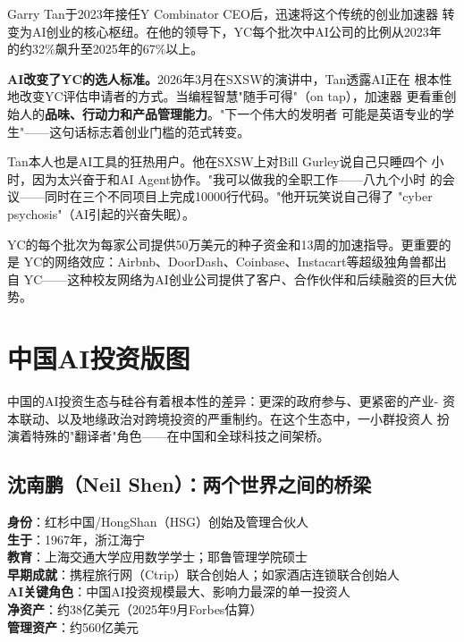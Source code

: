 Garry Tan于2023年接任Y Combinator CEO后，迅速将这个传统的创业加速器
转变为AI创业的核心枢纽。在他的领导下，YC每个批次中AI公司的比例从2023年
的约32\%飙升至2025年的67\%以上。

\textbf{AI改变了YC的选人标准。}2026年3月在SXSW的演讲中，Tan透露AI正在
根本性地改变YC评估申请者的方式。当编程智慧"随手可得"（on tap），加速器
更看重创始人的\textbf{品味、行动力和产品管理能力}。"下一个伟大的发明者
可能是英语专业的学生"——这句话标志着创业门槛的范式转变。

Tan本人也是AI工具的狂热用户。他在SXSW上对Bill Gurley说自己只睡四个
小时，因为太兴奋于和AI Agent协作。"我可以做我的全职工作——八九个小时
的会议——同时在三个不同项目上完成10000行代码。"他开玩笑说自己得了
"cyber psychosis"（AI引起的兴奋失眠）。

YC的每个批次为每家公司提供50万美元的种子资金和13周的加速指导。更重要的是
YC的网络效应：Airbnb、DoorDash、Coinbase、Instacart等超级独角兽都出自
YC——这种校友网络为AI创业公司提供了客户、合作伙伴和后续融资的巨大优势。


\section{中国AI投资版图}
\label{sec:inv-china}

中国的AI投资生态与硅谷有着根本性的差异：更深的政府参与、更紧密的产业-
资本联动、以及地缘政治对跨境投资的严重制约。在这个生态中，一小群投资人
扮演着特殊的"翻译者"角色——在中国和全球科技之间架桥。

\subsection{沈南鹏（Neil Shen）：两个世界之间的桥梁}
\label{subsec:inv-shen}

\begin{corebox}
\textbf{身份}：红杉中国/HongShan（HSG）创始及管理合伙人 \\
\textbf{生于}：1967年，浙江海宁 \\
\textbf{教育}：上海交通大学应用数学学士；耶鲁管理学院硕士 \\
\textbf{早期成就}：携程旅行网（Ctrip）联合创始人；如家酒店连锁联合创始人 \\
\textbf{AI关键角色}：中国AI投资规模最大、影响力最深的单一投资人 \\
\textbf{净资产}：约38亿美元（2025年9月Forbes估算） \\
\textbf{管理资产}：约560亿美元
\end{corebox}

